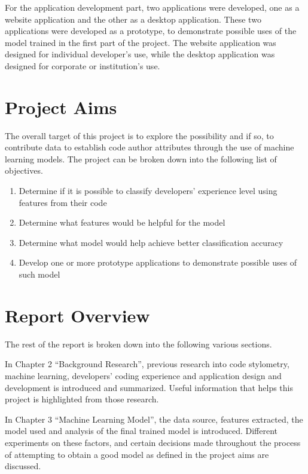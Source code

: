 \documentclass{report}
\begin{document}
For the application development part, two applications were developed, one as a website application and the other as a desktop application. These two applications were developed as a prototype, to demonstrate possible uses of the model trained in the first part of the project. The website application was designed for individual developer’s use, while the desktop application was designed for corporate or institution’s use.

\section{Project Aims}

The overall target of this project is to explore the possibility and if so, to contribute data to establish code author attributes through the use of machine learning models. The project can be broken down into the following list of objectives.

\begin{enumerate}
\item Determine if it is possible to classify developers’ experience level using features from their code
\item Determine what features would be helpful for the model
\item Determine what model would help achieve better classification accuracy
\item Develop one or more prototype applications to demonstrate possible uses of such model
\end{enumerate}

\section{Report Overview}

The rest of the report is broken down into the following various sections.

In Chapter 2 “Background Research”, previous research into code stylometry, machine learning, developers’ coding experience and application design and development is introduced and summarized. Useful information that helps this project is highlighted from those research.

In Chapter 3 “Machine Learning Model”, the data source, features extracted, the model used and analysis of the final trained model is introduced. Different experiments on these factors, and certain decisions made throughout the process of attempting to obtain a good model as defined in the project aims are discussed.
\end{document}
